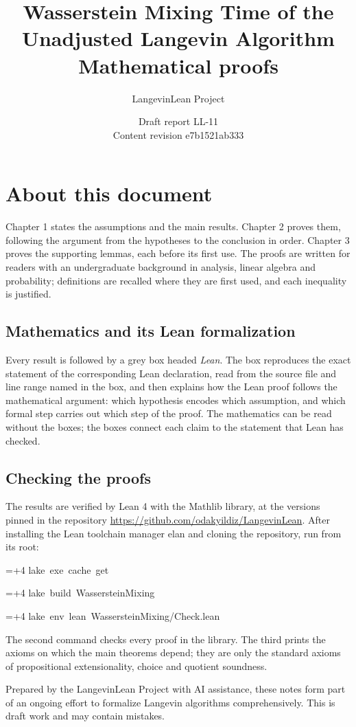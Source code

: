 \documentclass[11pt,a4paper]{report}
\title{\texorpdfstring{Wasserstein Mixing Time of the Unadjusted Langevin Algorithm}{Wasserstein Mixing Time of the Unadjusted Langevin Algorithm}\\[0.6em]\large Mathematical proofs}
\author{LangevinLean Project}
\date{Draft report LL-11\\[0.4em]\small Content revision e7b1521ab333}
\newlength{\leancharwidth}
\newenvironment{leancode}{\par\smallskip\begingroup\ttfamily\footnotesize\raggedright
  \settowidth{\leancharwidth}{M}\setlength{\parskip}{0pt}\setlength{\parindent}{0pt}
  \frenchspacing}{\par\endgroup\smallskip}
\newcommand{\leanline}[2]{\hangindent=\dimexpr#1\leancharwidth+4\leancharwidth\relax
  \hangafter=1\noindent\hspace*{#1\leancharwidth}#2\par}
\begin{document}
\maketitle
\chapter*{About this document}
Chapter 1 states the assumptions and the main results. Chapter 2 proves them, following the argument from the hypotheses to the conclusion in order. Chapter 3 proves the supporting lemmas, each before its first use. The proofs are written for readers with an undergraduate background in analysis, linear algebra and probability; definitions are recalled where they are first used, and each inequality is justified.

\section*{Mathematics and its Lean formalization}
Every result is followed by a grey box headed \emph{Lean}. The box reproduces the exact statement of the corresponding Lean declaration, read from the source file and line range named in the box, and then explains how the Lean proof follows the mathematical argument: which hypothesis encodes which assumption, and which formal step carries out which step of the proof. The mathematics can be read without the boxes; the boxes connect each claim to the statement that Lean has checked.

\section*{Checking the proofs}
The results are verified by Lean 4 with the Mathlib library, at the versions pinned in the repository \url{https://github.com/odakyildiz/LangevinLean}. After installing the Lean toolchain manager elan and cloning the repository, run from its root:
\begin{leancode}
\leanline{0}{lake\ exe\ cache\ get}
\leanline{0}{lake\ build\ WassersteinMixing}
\leanline{0}{lake\ env\ lean\ WassersteinMixing/Check.lean}
\end{leancode}
The second command checks every proof in the library. The third prints the axioms on which the main theorems depend; they are only the standard axioms of propositional extensionality, choice and quotient soundness.

Prepared by the LangevinLean Project with AI assistance, these notes form part of an ongoing effort to formalize Langevin algorithms comprehensively. This is draft work and may contain mistakes.
\end{document}

